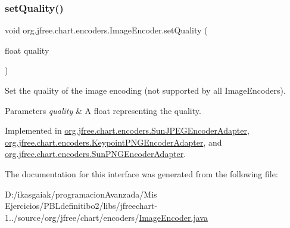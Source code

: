 \mbox{\label{interfaceorg_1_1jfree_1_1chart_1_1encoders_1_1_image_encoder_a143bbe40d39b16192a92128696877782}} 
\subsubsection{\texorpdfstring{set\+Quality()}{setQuality()}}
{\footnotesize\ttfamily void org.\+jfree.\+chart.\+encoders.\+Image\+Encoder.\+set\+Quality (\begin{DoxyParamCaption}\item[{float}]{quality }\end{DoxyParamCaption})}

Set the quality of the image encoding (not supported by all Image\+Encoders).


\begin{DoxyParams}{Parameters}
{\em quality} & A float representing the quality. \\
\hline
\end{DoxyParams}


Implemented in \mbox{\hyperlink{classorg_1_1jfree_1_1chart_1_1encoders_1_1_sun_j_p_e_g_encoder_adapter_a00787c98635f7300875c0246d8403712}{org.\+jfree.\+chart.\+encoders.\+Sun\+J\+P\+E\+G\+Encoder\+Adapter}}, \mbox{\hyperlink{classorg_1_1jfree_1_1chart_1_1encoders_1_1_keypoint_p_n_g_encoder_adapter_a4841320bd32da29b1de4fb3c09d80234}{org.\+jfree.\+chart.\+encoders.\+Keypoint\+P\+N\+G\+Encoder\+Adapter}}, and \mbox{\hyperlink{classorg_1_1jfree_1_1chart_1_1encoders_1_1_sun_p_n_g_encoder_adapter_a1cb7ff32f553cea1eccd1767e3050bb9}{org.\+jfree.\+chart.\+encoders.\+Sun\+P\+N\+G\+Encoder\+Adapter}}.



The documentation for this interface was generated from the following file\+:\begin{DoxyCompactItemize}
\item 
D\+:/ikasgaiak/programacion\+Avanzada/\+Mis Ejercicios/\+P\+B\+Ldefinitibo2/libs/jfreechart-\/1../source/org/jfree/chart/encoders/\mbox{\hyperlink{_image_encoder_8java}{Image\+Encoder.\+java}}\end{DoxyCompactItemize}
